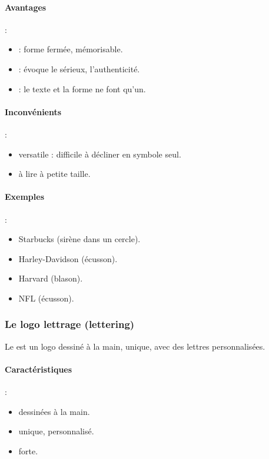 \paragraph{Avantages} :
\begin{itemize}
    \item {} : forme fermée, mémorisable.
    \item {} : évoque le sérieux, l'authenticité.
    \item {} : le texte et la forme ne font qu'un.
\end{itemize}

\paragraph{Inconvénients} :
\begin{itemize}
    \item {} versatile : difficile à décliner en symbole seul.
    \item {} à lire à petite taille.
\end{itemize}

\paragraph{Exemples} :
\begin{itemize}
    \item Starbucks (sirène dans un cercle).
    \item Harley-Davidson (écusson).
    \item Harvard (blason).
    \item NFL (écusson).
\end{itemize}

\subsubsection{Le logo lettrage (lettering)}

Le  est un logo dessiné à la main, unique, avec des lettres personnalisées.

\paragraph{Caractéristiques} :
\begin{itemize}
    \item {} dessinées à la main.
    \item {} unique, personnalisé.
    \item {} forte.
\end{itemize}

